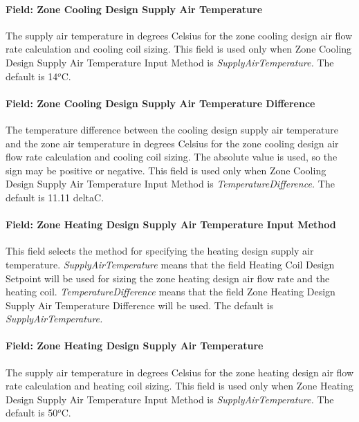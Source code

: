 \paragraph{Field: Zone Cooling Design Supply Air Temperature}\label{field-zone-cooling-design-supply-air-temperature-3}

The supply air temperature in degrees Celsius for the zone cooling design air flow rate calculation and cooling coil sizing. This field is used only when Zone Cooling Design Supply Air Temperature Input Method is \emph{SupplyAirTemperature.} The default is 14\(^{o}\)C.

\paragraph{Field: Zone Cooling Design Supply Air Temperature Difference}\label{field-zone-cooling-design-supply-air-temperature-difference-4}

The temperature difference between the cooling design supply air temperature and the zone air temperature in degrees Celsius for the zone cooling design air flow rate calculation and cooling coil sizing. The absolute value is used, so the sign may be positive or negative. This field is used only when Zone Cooling Design Supply Air Temperature Input Method is \emph{TemperatureDifference.} The default is 11.11 deltaC.

\paragraph{Field: Zone Heating Design Supply Air Temperature Input Method}\label{field-zone-heating-design-supply-air-temperature-input-method-4}

This field selects the method for specifying the heating design supply air temperature. \emph{SupplyAirTemperature} means that the field Heating Coil Design Setpoint will be used for sizing the zone heating design air flow rate and the heating coil. \emph{TemperatureDifference} means that the field Zone Heating Design Supply Air Temperature Difference will be used. The default is \emph{SupplyAirTemperature.}

\paragraph{Field: Zone Heating Design Supply Air Temperature}\label{field-zone-heating-design-supply-air-temperature-3}

The supply air temperature in degrees Celsius for the zone heating design air flow rate calculation and heating coil sizing. This field is used only when Zone Heating Design Supply Air Temperature Input Method is \emph{SupplyAirTemperature.} The default is 50\(^{o}\)C.


